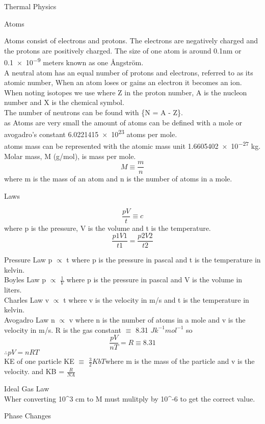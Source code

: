 \documentclass{article}
\newcommand\hr{\par\vspace{-.5\ht\strutbox}\noindent\hrulefill\par}
\newcommand\br{\vspace{0.5cm}}
\begin{document}
\Huge \raggedright Thermal Physics \\ \vspace{1cm}
    \hr
    \LARGE \center Atoms \\
    \br
    
    \raggedright
    \large Atoms consist of electrons and protons. The electrons are negatively charged and the protons are positively charged. The size of one atom is around 0.1nm or \num{0.1e-9} meters known as one Ångström. \\
    \large A neutral atom has an equal number of protons and electrons, referred to as its atomic number, When an atom loses or gains an electron it becomes an ion. When noting isotopes we use  where Z in the proton number, A is the nucleon number and X is the chemical symbol. \\ 
    \large The number of neutrons can be found with \{N = A - Z\}. \\ 
    \large as Atoms are very small the amount of atoms can be defined with a mole or avogadro's constant \num{6.0221415e23} atoms per mole. \\
    \large atoms mass can be represented with the atomic mass unit \num{1.6605402e-27} kg. \\
    \large Molar mass, M (g/mol), is mass per mole. \[M \equiv \frac{m}{n}\] where m is the mass of an atom and n is the number of atoms in a mole. \\




    \hr
    \LARGE \center Laws \\
    \begin{large}
    \[ \frac{pV}{t} \equiv c\] where p is the pressure, V is the volume and t is the temperature. 
    \[\frac{p1V1}{t1} = \frac{p2V2}{t2}\]
    \raggedright
    Pressure Law p $\propto$ t where p is the pressure in pascal and t is the temperature in kelvin. \\
    Boyles Law p $\propto$ $\frac{1}{V}$ where p is the pressure in pascal and V is the volume in liters. \\
    Charles Law v $\propto$ t where v is the velocity in m/s and t is the temperature in kelvin. \\
    Avogadro Law n $\propto$ v where n is the number of atoms in a mole and v is the velocity in m/s. R is the gas constant $\equiv$ 8.31 $Jk^{-1} mol^{-1}$ so \[\frac{pV}{nT} = R \equiv 8.31\] $\therefore pV=nRT$ \\
    KE of one particle KE $\equiv$ $\frac{3}{2}KbT$where m is the mass of the particle and v is the velocity. and KB = $\frac{R}{NA}$\\
\end{large}


    \hr
    \LARGE \center Ideal Gas Law \\
    \br
    Wher converting 10^3 cm to M must mulitply by 10^-6 to get the correct value. \\
    \raggedright



    \hr
    \LARGE \center Phase Changes \\
    \br
    \raggedright

    \hr
\end{document}

